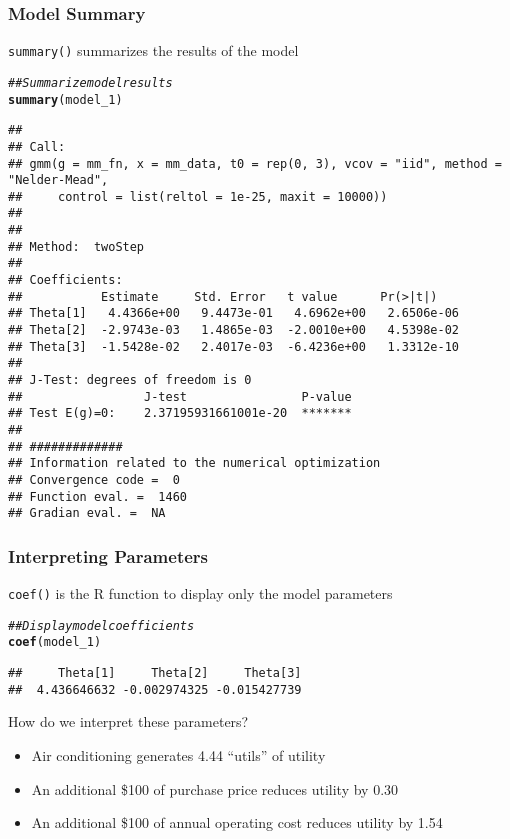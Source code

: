 \documentclass{beamer}\usepackage[]{graphicx}\usepackage[]{color}
\makeatletter
\newcommand{\hlcom}[1]{\textcolor[rgb]{0.678,0.584,0.686}{\textit{#1}}}%
\newcommand{\hlstd}[1]{\textcolor[rgb]{0.345,0.345,0.345}{#1}}%
\newcommand{\hlkwd}[1]{\textcolor[rgb]{0.737,0.353,0.396}{\textbf{#1}}}%
\newenvironment{kframe}{%
 \def\at@end@of@kframe{}%
 \ifinner\ifhmode%
  \def\at@end@of@kframe{\end{minipage}}%
  \begin{minipage}{\columnwidth}%
 \fi\fi%
 \def\FrameCommand##1{\hskip\@totalleftmargin \hskip-\fboxsep
 \colorbox{shadecolor}{##1}\hskip-\fboxsep
     \hskip-\linewidth \hskip-\@totalleftmargin \hskip\columnwidth}%
 \MakeFramed {\advance\hsize-\width
   \@totalleftmargin\z@ \linewidth\hsize
   \@setminipage}}%
 {\par\unskip\endMakeFramed%
 \at@end@of@kframe}
\newenvironment{knitrout}{}{} %
\makeatother
\begin{document}
\begin{frame}[fragile]\frametitle{Model Summary}
    \texttt{summary()} summarizes the results of the model
    \vspace{1ex}
\begin{knitrout}\tiny
{}\color{fgcolor}\begin{kframe}
\begin{alltt}
\hlcom{## Summarize model results}
\hlkwd{summary}\hlstd{(model_1)}
\end{alltt}
\begin{verbatim}
## 
## Call:
## gmm(g = mm_fn, x = mm_data, t0 = rep(0, 3), vcov = "iid", method = "Nelder-Mead", 
##     control = list(reltol = 1e-25, maxit = 10000))
## 
## 
## Method:  twoStep 
## 
## Coefficients:
##           Estimate     Std. Error   t value      Pr(>|t|)   
## Theta[1]   4.4366e+00   9.4473e-01   4.6962e+00   2.6506e-06
## Theta[2]  -2.9743e-03   1.4865e-03  -2.0010e+00   4.5398e-02
## Theta[3]  -1.5428e-02   2.4017e-03  -6.4236e+00   1.3312e-10
## 
## J-Test: degrees of freedom is 0 
##                 J-test                P-value             
## Test E(g)=0:    2.37195931661001e-20  *******             
## 
## #############
## Information related to the numerical optimization
## Convergence code =  0 
## Function eval. =  1460 
## Gradian eval. =  NA
\end{verbatim}
\end{kframe}
\end{knitrout}
\end{frame}

\begin{frame}[fragile]\frametitle{Interpreting Parameters}
    \texttt{coef()} is the R function to display only the model parameters
\begin{knitrout}\footnotesize
{}\color{fgcolor}\begin{kframe}
\begin{alltt}
\hlcom{## Display model coefficients}
\hlkwd{coef}\hlstd{(model_1)}
\end{alltt}
\begin{verbatim}
##     Theta[1]     Theta[2]     Theta[3] 
##  4.436646632 -0.002974325 -0.015427739
\end{verbatim}
\end{kframe}
\end{knitrout}
    \vspace{2ex}
    How do we interpret these parameters?
    \begin{itemize}
        \item Air conditioning generates 4.44 ``utils'' of utility
        \item An additional \$100 of purchase price reduces utility by 0.30
        \item An additional \$100 of annual operating cost reduces utility by 1.54
    \end{itemize}
\end{frame}
\end{document}
